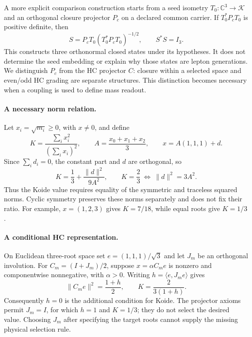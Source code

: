 A more explicit comparison construction starts from a seed isometry
$T_0:\mathbb C^3\to\mathcal K$ and an orthogonal closure projector
$P_c$ on a declared common carrier. If $T_0^*P_cT_0$ is positive
definite, then
\begin{equation}
 S=P_cT_0(T_0^*P_cT_0)^{-1/2},\qquad S^*S=I_3.
\end{equation}
This constructs three orthonormal closed states under its hypotheses.
It does not determine the seed embedding or explain why those states
are lepton generations. We distinguish $P_c$ from the HC projector $C$:
closure within a selected space and even/odd HC grading are separate
structures. This distinction becomes necessary when a coupling is
used to define mass readout.
\paragraph{A necessary norm relation.}
Let $x_i=\sqrt{m_i}\geq0$, with $x\ne0$, and define
\begin{equation}
 K=\frac{\sum_i x_i^2}{(\sum_i x_i)^2},\qquad
 A=\frac{x_0+x_1+x_2}{3},\qquad x=A(1,1,1)+d.
\end{equation}
Since $\sum_i d_i=0$, the constant part and $d$ are orthogonal, so
\begin{equation}
 K=\frac13+\frac{\|d\|^2}{9A^2},\qquad
 K=\frac23\ \Longleftrightarrow\ \|d\|^2=3A^2.
\end{equation}
Thus the Koide value requires equality of the symmetric and traceless
squared norms. Cyclic symmetry preserves these norms separately and
does not fix their ratio. For example, $x=(1,2,3)$ gives $K=7/18$,
while equal roots give $K=1/3$.

\paragraph{A conditional HC representation.}
On Euclidean three-root space set $e=(1,1,1)/\sqrt3$ and let $J_m$
be an orthogonal involution. For $C_m=(I+J_m)/2$, suppose
$x=\alpha C_me$ is nonzero and componentwise nonnegative, with
$\alpha>0$. Writing $h=\langle e,J_me\rangle$ gives
\begin{equation}
 \|C_me\|^2=\frac{1+h}{2},\qquad
 K=\frac{2}{3(1+h)}.
\end{equation}
Consequently $h=0$ is the additional condition for Koide. The projector
axioms permit $J_m=I$, for which $h=1$ and $K=1/3$; they do not select
the desired value. Choosing $J_m$ after specifying the target roots
cannot supply the missing physical selection rule.


